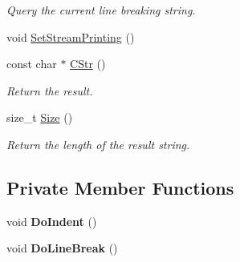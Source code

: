 \begin{DoxyCompactItemize}
\begin{DoxyCompactList}\small\item\em \-Query the current line breaking string. \end{DoxyCompactList}\item 
void \hyperlink{class_ti_xml_printer_ab23a90629e374cb1cadca090468bbd19}{\-Set\-Stream\-Printing} ()
\item 
\hypertarget{class_ti_xml_printer_a859eede9597d3e0355b77757be48735e}{const char $\ast$ \hyperlink{class_ti_xml_printer_a859eede9597d3e0355b77757be48735e}{\-C\-Str} ()}\label{class_ti_xml_printer_a859eede9597d3e0355b77757be48735e}

\begin{DoxyCompactList}\small\item\em \-Return the result. \end{DoxyCompactList}\item 
\hypertarget{class_ti_xml_printer_ad01375ae9199bd2f48252eaddce3039d}{size\-\_\-t \hyperlink{class_ti_xml_printer_ad01375ae9199bd2f48252eaddce3039d}{\-Size} ()}\label{class_ti_xml_printer_ad01375ae9199bd2f48252eaddce3039d}

\begin{DoxyCompactList}\small\item\em \-Return the length of the result string. \end{DoxyCompactList}\end{DoxyCompactItemize}
\subsection*{\-Private \-Member \-Functions}
\begin{DoxyCompactItemize}
\item 
\hypertarget{class_ti_xml_printer_a348ad6527b1d43ddeb51454cddeb6a1d}{void {\bfseries \-Do\-Indent} ()}\label{class_ti_xml_printer_a348ad6527b1d43ddeb51454cddeb6a1d}

\item 
\hypertarget{class_ti_xml_printer_a252a0e13e06def9a06b2eb30a04677a0}{void {\bfseries \-Do\-Line\-Break} ()}\label{class_ti_xml_printer_a252a0e13e06def9a06b2eb30a04677a0}

\end{DoxyCompactItemize}
